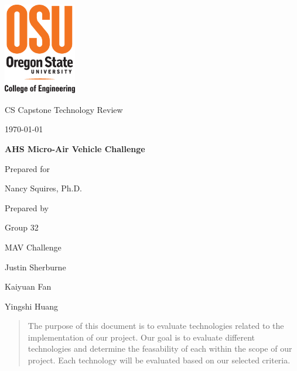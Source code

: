 \documentclass[onecolumn, draftclsnofoot,10pt, compsoc]{IEEEtran}
\def \CapstoneTeamName{		MAV Challenge}
\def \CapstoneTeamNumber{		32}
\def \GroupMemberOne{			Justin Sherburne}
\def \GroupMemberTwo{			Kaiyuan Fan}
\def \GroupMemberThree{			Yingshi Huang}
\def \CapstoneProjectName{		AHS Micro-Air Vehicle Challenge}
\def \CapstoneSponsorPerson{		Nancy Squires, Ph.D.}
\def \DocType{		%
				Technology Review
				}
\newcommand{\NameSigPair}[1]{\par
\makebox[2.75in][r]{#1} \hfil 	\makebox[3.25in]{\makebox[2.25in]{\hrulefill} \hfill		\makebox[.75in]{\hrulefill}}
\par\vspace{-12pt} \textit{\tiny\noindent
\makebox[2.75in]{} \hfil		\makebox[3.25in]{\makebox[2.25in][r]{Signature} \hfill	\makebox[.75in][r]{Date}}}}
\renewcommand{\NameSigPair}[1]{#1}
\begin{document}
\begin{titlepage}
    \begin{singlespace}
    	\includegraphics[height=4cm]{coe_v_spot1}
        \hfill 
        \par\vspace{.2in}
        \centering
        \scshape{
            \huge CS Capstone \DocType \par
            {\large\today}\par
            \vspace{8pt}
            \textbf{\Huge\CapstoneProjectName}\par
			\vspace{1.5in}
            {\large Prepared for}\par
            {\Large\NameSigPair{\CapstoneSponsorPerson}\par}
			\vspace{3pt}
            {\large Prepared by }\par
            Group\CapstoneTeamNumber\par
            \CapstoneTeamName\par 
            \vspace{8pt}
            {\Large
                \NameSigPair{\GroupMemberOne}\par
                \NameSigPair{\GroupMemberTwo}\par
                \NameSigPair{\GroupMemberThree}\par
            }
            \vspace{.5in}
        }
        \begin{abstract}
        The purpose of this document is to evaluate technologies related to the implementation of our project. Our goal is to evaluate different technologies and determine the feasability of each within the scope of our project. Each technology will be evaluated based on our selected criteria.  
        \end{abstract}     
    \end{singlespace}
\end{titlepage}
\newpage
{}
\tableofcontents
\clearpage
\end{document}
